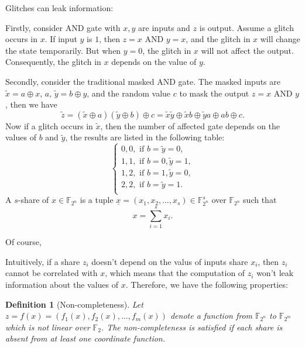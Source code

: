 \documentclass[12 pt]{article}
\newtheorem{definition}{Definition}
\def\F{{\mathbb F}}
\begin{document}
    Glitches can leak information:

    Firstly, consider AND gate with $ x,y $ are inputs and $ z $ is output. 
    Assume a glitch occurs in $ x $. If input $ y $ is $ 1 $, then $ z=x\text{~AND~}y=x $, and the glitch in $ x $ will 
    change the state temporarily. But when $ y=0 $, the glitch in $ x $ will not affect the output. Consequently, 
    the glitch in $ x $ depends on the value of $ y $.

    Secondly, consider the traditional masked AND gate. The masked inputs are $ \widetilde{x}=a\oplus x  $, $ a $,  
    $ \widetilde{y}=b\oplus y $, and the random value $ c $ to mask the output $ z=x\text{~AND~}y $, then we have 
    \[\widetilde{z}=(\widetilde{x}\oplus a)(\widetilde{y}\oplus b)\oplus c=\widetilde{x}\widetilde{y}\oplus\widetilde{x}b\oplus\widetilde{y}a\oplus ab\oplus c.\]
    Now if a glitch occurs in $ \widetilde{x} $, then the number of affected gate depends on the values of $ b $ and 
    $ \widetilde{y} $, the results are listed in the following table:
    \begin{equation}
      \begin{cases}
        0,0,\text{~if~}b=\widetilde{y}=0,\\  
        1,1,\text{~if~}b=0,\widetilde{y}=1,\\  
        1,2,\text{~if~}b=1,\widetilde{y}=0,\\  
        2,2,\text{~if~}b=\widetilde{y}=1.\\  
      \end{cases}
    \end{equation}
    A $ s $-share of $ x\in\F_{2^n} $ is a tuple $ \underline{x}=(x_1,x_2,\dots,x_s)\in\F_{2^n}^s  $ over $ \F_{2^n} $
    such that 
    \[x=\sum_{i=1}^{s}x_i.\]

    Of course,  
 
    Intuitively, if a share $ z_i $ doesn't depend on the valus of inputs share $ x_i $, then $ z_i $ 
    cannot be correlated with $ x $, which means that the computation of $ z_i $ won't leak information 
    about the values of $ x $. Therefore, we have the following properties:
    \begin{definition}[Non-completeness]
      Let $ z=f(x)=(f_1(x),f_2(x),\dots,f_m(x)) $ denote a function from $ \F_{2^n} $ to $ \F_{2^m} $
      which is not linear over $ \F_2 $. The non-completeness is satisfied if each share is absent from at least one 
      coordinate function.
    \end{definition}
\end{document}
